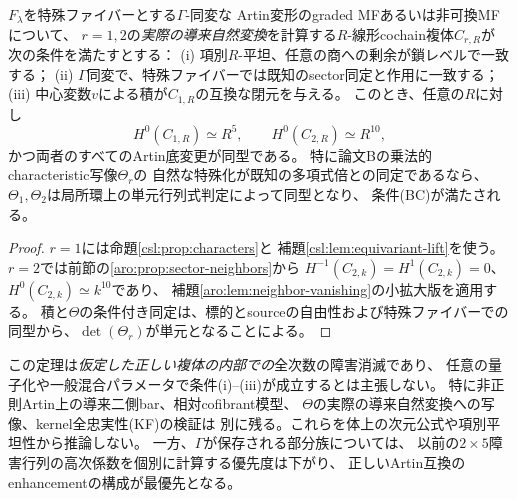 \begin{theorem}[混合族の低rotation底変更に関する条件付き対称性定理]
\label{csl:thm:conditional-bc}
$F_\lambda$を特殊ファイバーとする$\Gamma$-同変な
Artin変形のgraded MFあるいは非可換MFについて、
$r=1,2$の\emph{実際の導来自然変換}を計算する$R$-線形cochain複体$C_{r,R}$が
次の条件を満たすとする：
(i) 項別$R$-平坦、任意の商への剰余が鎖レベルで一致する；
(ii) $\Gamma$同変で、特殊ファイバーでは既知のsector同定と作用に一致する；
(iii) 中心変数$v$による積が$C_{1,R}$の互換な閉元を与える。
このとき、任意の$R$に対し
\[
 H^0(C_{1,R})\simeq R^5,\qquad
 H^0(C_{2,R})\simeq R^{10},
 \tag{CSL3}\label{csl:eq:bc}
\]
かつ両者のすべてのArtin底変更が同型である。
特に論文Bの乗法的characteristic写像$\Theta_r$の
自然な特殊化が既知の多項式倍との同定であるなら、
$\Theta_1,\Theta_2$は局所環上の単元行列式判定によって同型となり、
条件(BC)が満たされる。
\end{theorem}
\begin{proof}
$r=1$には命題\ref{csl:prop:characters}と
補題\ref{csl:lem:equivariant-lift}を使う。
$r=2$では前節の\ref{aro:prop:sector-neighbors}から
$H^{-1}(C_{2,k})=H^1(C_{2,k})=0$、
$H^0(C_{2,k})\simeq k^{10}$であり、
補題\ref{aro:lem:neighbor-vanishing}の小拡大版を適用する。
積と$\Theta$の条件付き同定は、標的とsourceの自由性および特殊ファイバーでの同型から、$\det(\Theta_r)$が単元となることによる。
\end{proof}

\begin{remark}\label{csl:rem:scope}
この定理は\emph{仮定した正しい複体の内部での}全次数の障害消滅であり、
任意の量子化や一般混合パラメータで条件(i)--(iii)が成立するとは主張しない。
特に非正則Artin上の導来二側bar、相対cofibrant模型、
$\Theta$の実際の導来自然変換への写像、kernel全忠実性(KF)の検証は
別に残る。これらを体上の次元公式や項別平坦性から推論しない。
一方、$\Gamma$が保存される部分族については、
以前の$2\times5$障害行列の高次係数を個別に計算する優先度は下がり、
正しいArtin互換のenhancementの構成が最優先となる。
\end{remark}
